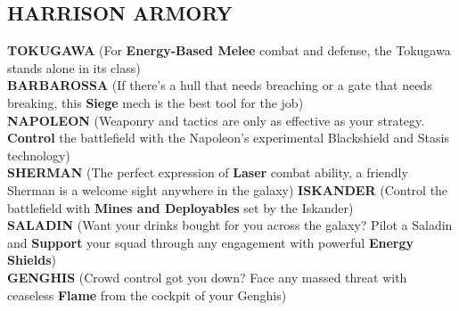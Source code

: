 \subsection*{HARRISON ARMORY}

\textbf{TOKUGAWA} (For \textbf{Energy-Based Melee} combat and defense, the Tokugawa stands alone in its class)\\
\textbf{BARBAROSSA} (If there's a hull that needs breaching or a gate that needs breaking, this \textbf{Siege} mech is the best tool for the job)\\
\textbf{NAPOLEON} (Weaponry and tactics are only as effective as your strategy. \textbf{Control} the battlefield with the Napoleon's experimental Blackshield and Stasis technology)\\ 
\textbf{SHERMAN} (The perfect expression of \textbf{Laser} combat ability, a friendly Sherman is a welcome sight anywhere in the galaxy)
\textbf{ISKANDER} (Control the battlefield with \textbf{Mines and Deployables} set by the Iskander)\\
\textbf{SALADIN} (Want your drinks bought for you across the galaxy? Pilot a Saladin and \textbf{Support} your squad through any engagement with powerful \textbf{Energy Shields})\\
\textbf{GENGHIS} (Crowd control got you down? Face any massed threat with ceaseless \textbf{Flame} from the cockpit of your Genghis) 
